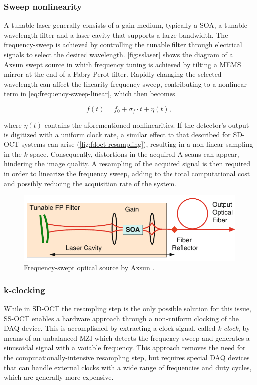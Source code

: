\subsubsection{Sweep nonlinearity}
A tunable laser generally consists of a gain medium, typically a \ac{SOA}, a tunable wavelength filter and a laser cavity that supports a large bandwidth. The frequency-sweep is achieved by controlling the tunable filter through electrical signals to select the desired wavelength. \autoref{fig:sslaser} shows the diagram of a Axsun swept source in which frequency tuning is achieved by tilting a \ac{MEMS} mirror at the end of a Fabry-Perot filter. Rapidly changing the selected wavelength can affect the linearity frequency sweep, contributing to a nonlinear term in \autoref{eq:frequency-sweep-linear}, which then becomes

\begin{equation}
	f(t) = f_0 + \sigma_f \cdot t + \eta (t),
\end{equation}

where $\eta(t)$ contains the aforementioned nonlinearities. If the detector's output is digitized with a uniform clock rate, a similar effect to that described for \ac{SD-OCT} systems can arise (\autoref{fig:fdoct-resampling}), resulting in a non-linear sampling in the $k$-space. Consequently, distortions in the acquired A-scans can appear, hindering the image quality. A resampling of the acquired signal is then required in order to linearize the frequency sweep, adding to the total computational cost and possibly reducing the acquisition rate of the system. 


\begin{figure}[hbt]
	\myfloatalign
	\includegraphics[width=0.7\linewidth]{gfx/ch2/sslaser}
	\caption{Frequency-swept optical source by Axsun \cite{Drexler2015}.}\label{fig:sslaser}
\end{figure}

\subsubsection{k-clocking}

While in \ac{SD-OCT} the resampling step is the only possible solution for this issue, \ac{SS-OCT} enables a hardware approach through a non-uniform clocking of the \ac{DAQ} device. This is accomplished by extracting a clock signal, called \emph{k-clock}, by means of an unbalanced \acf{MZI} which detects the frequency-sweep and generates a sinusoidal signal with a variable frequency. This approach removes the need for the computationally-intensive resampling step, but requires special \ac{DAQ} devices that can handle external clocks with a wide range of frequencies and duty cycles, which are generally more expensive.  


